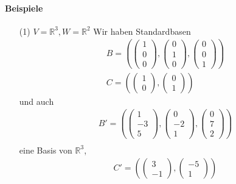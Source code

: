 \documentclass[11pt]{report}
\newcommand*\Zb[1] {\mathbb{#1}}
\begin{document}
\paragraph{Beispiele}
\begin{itemize}
 \item[(1)] $V = \Zb{R}^3, W = \Zb{R}^2$
Wir haben Standardbasen
\begin{align}
 B = \left( \begin{pmatrix} 1 \\ 0 \\ 0 \end{pmatrix}, \begin{pmatrix}0 \\ 1 \\ 0 \end{pmatrix}, \begin{pmatrix} 0 \\ 0 \\ 1 \end{pmatrix}\right) \\
 C = \left( \begin{pmatrix} 1 \\ 0 \end{pmatrix}, \begin{pmatrix} 0 \\ 1 \end{pmatrix}\right) 
\end{align}
und auch
\begin{align}
 B' = \left( \begin{pmatrix} 1 \\ -3 \\ 5 \end{pmatrix}, \begin{pmatrix}0 \\ -2 \\ 1 \end{pmatrix}, \begin{pmatrix} 0 \\ 7 \\ 2  \end{pmatrix}\right) \\
\end{align}
eine Basis von $\Zb{R}^3$,
\begin{align}
 C' = \left( \begin{pmatrix} 3  \\ -1 \end{pmatrix}, \begin{pmatrix} -5 \\ 1 \end{pmatrix}\right) \\

\end{align}
\end{itemize}
\end{document}
